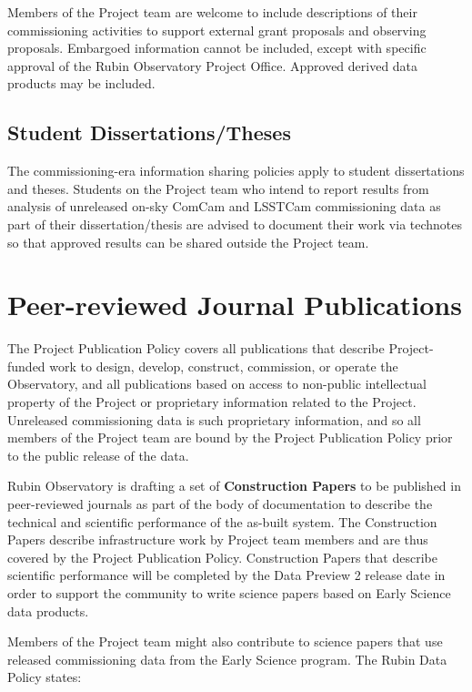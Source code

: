 \documentclass[SE,authoryear,toc]{lsstdoc}
\begin{document}
Members of the Project team are welcome to include descriptions of their commissioning activities to support external grant proposals and observing proposals.
Embargoed information cannot be included, except with specific approval of the Rubin Observatory Project Office.
Approved derived data products may be included.

\subsection{Student Dissertations/Theses}

The commissioning-era information sharing policies apply to student dissertations and theses.
Students on the Project team who intend to report results from analysis of unreleased on-sky ComCam and LSSTCam commissioning data as part of their dissertation/thesis are advised to document their work via technotes so that approved results can be shared outside the Project team.

\section{Peer-reviewed Journal Publications}
\label{publications}

The Project Publication Policy  covers all publications that describe Project-funded work to design, develop, construct, commission, or operate the Observatory, and all publications based on access to non-public intellectual property of the Project or proprietary information related to the Project.
Unreleased commissioning data is such proprietary information, and so all members of the Project team are bound by the Project Publication Policy prior to the public release of the data.

Rubin Observatory is drafting a set of \textbf{Construction Papers} to be published in peer-reviewed journals as part of the body of documentation to describe the technical and scientific performance of the as-built system.
The Construction Papers describe infrastructure work by Project team members and are thus covered by the Project Publication Policy.
Construction Papers that describe scientific performance will be completed by the Data Preview 2 release date in order to support the community to write science papers based on Early Science data products.

Members of the Project team might also contribute to science papers that use released commissioning data from the Early Science program.
The Rubin Data Policy  states:
\end{document}
